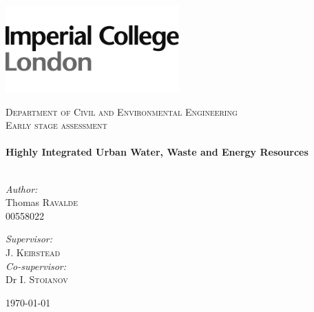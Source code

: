 \begin{titlepage}


\includegraphics[width=0.5\textwidth]{./img/ImperialLogo.jpg}\\[1cm]

\begin{center}

\textsc{\large Department of Civil and Environmental Engineering}\\[1.5cm]

\textsc{\Large Early stage assessment}\\[0.5cm]

\HRule \\[0.4cm]
{ \LARGE \bfseries Highly Integrated Urban Water, Waste and Energy Resources}\\[0.4cm]

\HRule \\[1.5cm]

\begin{minipage}{0.5\textwidth}
\begin{flushleft} \large
\emph{Author:}\\
Thomas \textsc{Ravalde}\\
00558022 \\
\end{flushleft}
\end{minipage}
\begin{minipage}{0.4\textwidth}
\begin{flushright} \large
\emph{Supervisor:} \\
J. \textsc{Keirstead} \\
\emph{Co-supervisor:} \\
Dr I. \textsc{Stoianov} \\
\end{flushright}
\end{minipage}

\vfill

{\today}

\end{center}

\end{titlepage}
